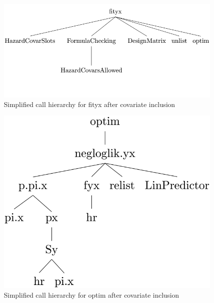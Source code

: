 \documentclass[11pt]{article}
\begin{document}
\begin{multicols}{2}

\begin{figure}[H]
\center
\includegraphics[scale=0.4512]{LT2Dpostcovfityx}
\caption{Simplified call hierarchy for fityx after covariate inclusion}
\end{figure}


\begin{figure}[H]
\center
\includegraphics[scale=0.4909]{LT2Dpostcovoptim}
\caption{Simplified call hierarchy for optim after covariate inclusion}
\end{figure}


\end{multicols}
\end{document}
